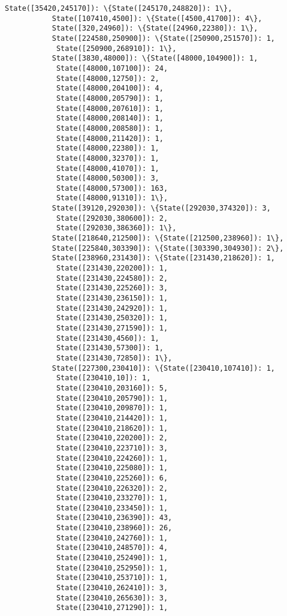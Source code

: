\documentclass[11pt]{article}
\begin{document}
\begin{Verbatim}[commandchars=\\\{\}]
           State([35420,245170]): \{State([245170,248820]): 1\},
           State([107410,4500]): \{State([4500,41700]): 4\},
           State([320,24960]): \{State([24960,22380]): 1\},
           State([224580,250900]): \{State([250900,251570]): 1,
            State([250900,268910]): 1\},
           State([3830,48000]): \{State([48000,104900]): 1,
            State([48000,107100]): 24,
            State([48000,12750]): 2,
            State([48000,204100]): 4,
            State([48000,205790]): 1,
            State([48000,207610]): 1,
            State([48000,208140]): 1,
            State([48000,208580]): 1,
            State([48000,211420]): 1,
            State([48000,22380]): 1,
            State([48000,32370]): 1,
            State([48000,41070]): 1,
            State([48000,50300]): 3,
            State([48000,57300]): 163,
            State([48000,91310]): 1\},
           State([39120,292030]): \{State([292030,374320]): 3,
            State([292030,380600]): 2,
            State([292030,386360]): 1\},
           State([218640,212500]): \{State([212500,238960]): 1\},
           State([225840,303390]): \{State([303390,304930]): 2\},
           State([238960,231430]): \{State([231430,218620]): 1,
            State([231430,220200]): 1,
            State([231430,224580]): 2,
            State([231430,225260]): 3,
            State([231430,236150]): 1,
            State([231430,242920]): 1,
            State([231430,250320]): 1,
            State([231430,271590]): 1,
            State([231430,4560]): 1,
            State([231430,57300]): 1,
            State([231430,72850]): 1\},
           State([227300,230410]): \{State([230410,107410]): 1,
            State([230410,10]): 1,
            State([230410,203160]): 5,
            State([230410,205790]): 1,
            State([230410,209870]): 1,
            State([230410,214420]): 1,
            State([230410,218620]): 1,
            State([230410,220200]): 2,
            State([230410,223710]): 3,
            State([230410,224260]): 1,
            State([230410,225080]): 1,
            State([230410,225260]): 6,
            State([230410,226320]): 2,
            State([230410,233270]): 1,
            State([230410,233450]): 1,
            State([230410,236390]): 43,
            State([230410,238960]): 26,
            State([230410,242760]): 1,
            State([230410,248570]): 4,
            State([230410,252490]): 1,
            State([230410,252950]): 1,
            State([230410,253710]): 1,
            State([230410,262410]): 3,
            State([230410,265630]): 3,
            State([230410,271290]): 1,

\end{Verbatim}
\end{document}
